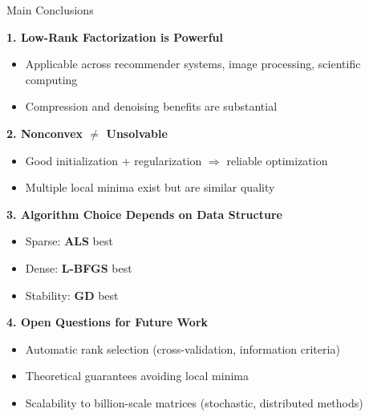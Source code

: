 \documentclass[aspectratio=169,usenames,dvipsnames]{beamer}
\begin{document}
\begin{frame}{Main Conclusions}
    
    \textbf{1. Low-Rank Factorization is Powerful}
    \begin{itemize}
        \item Applicable across recommender systems, image processing, scientific computing
        \item Compression and denoising benefits are substantial
    \end{itemize}
    
    \vspace{0.3cm}
    
    \textbf{2. Nonconvex $\neq$ Unsolvable}
    \begin{itemize}
        \item Good initialization + regularization $\Rightarrow$ reliable optimization
        \item Multiple local minima exist but are similar quality
    \end{itemize}
    
    \vspace{0.3cm}
    
    \textbf{3. Algorithm Choice Depends on Data Structure}
    \begin{itemize}
        \item Sparse: \textbf{ALS} best
        \item Dense: \textbf{L-BFGS} best
        \item Stability: \textbf{GD} best
    \end{itemize}
    
    \vspace{0.3cm}
    
    \textbf{4. Open Questions for Future Work}
    \begin{itemize}
        \item Automatic rank selection (cross-validation, information criteria)
        \item Theoretical guarantees avoiding local minima
        \item Scalability to billion-scale matrices (stochastic, distributed methods)
    \end{itemize}
\end{frame}
\end{document}

